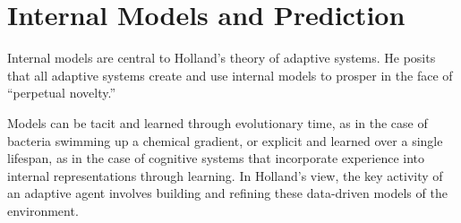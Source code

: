\documentclass{sig-alternate}
\begin{document}





\section{Internal Models and Prediction}


Internal models are central to Holland's theory of adaptive systems.
He posits that all adaptive systems create and use internal models to
prosper in the face of ``perpetual novelty.'' 

Models can be tacit and learned through evolutionary time, as in the
case of bacteria swimming up a chemical gradient, or explicit and
learned over a single lifespan, as in the case of cognitive systems
that incorporate experience into internal representations through
learning.  In Holland's view, the key activity of an adaptive agent
involves building and refining these data-driven models of the
environment.
\end{document}
